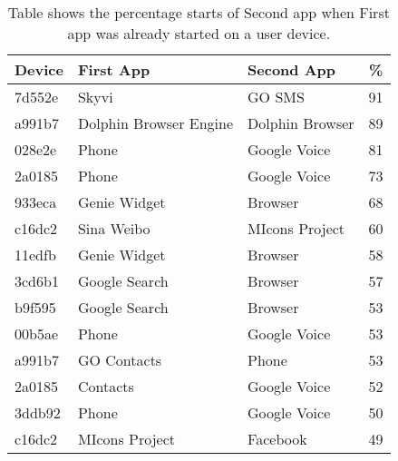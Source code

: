 \begin{table}[t]
{\small
\begin{tabularx}{\columnwidth}{lXXc}
\multicolumn{1}{l}{\normalsize{\textbf{Device}}} &
\multicolumn{1}{l}{\normalsize{\textbf{First App}}} &
\multicolumn{1}{l}{\normalsize{\textbf{Second App}}} &
\multicolumn{1}{c}{\normalsize{\textbf{\%}}} \\
\toprule
7d552e & Skyvi & GO SMS & 91\\ 
a991b7 & Dolphin Browser Engine & Dolphin Browser & 89\\ 
028e2e & Phone & Google Voice & 81\\ 
2a0185 & Phone & Google Voice & 73\\ 
933eca & Genie Widget & Browser & 68\\ 
c16dc2 & Sina Weibo & MIcons Project & 60\\ 
11edfb & Genie Widget & Browser & 58\\ 
3cd6b1 & Google Search & Browser & 57\\ 
b9f595 & Google Search & Browser & 53\\ 
00b5ae & Phone & Google Voice & 53\\ 
a991b7 & GO Contacts & Phone & 53\\ 
2a0185 & Contacts & Google Voice & 52\\ 
3ddb92 & Phone & Google Voice & 50\\ 
c16dc2 & MIcons Project & Facebook & 49\\ 
\end{tabularx}}
\caption{Table shows the percentage starts of Second app when First app was already started on a user device.}
\end{table}
